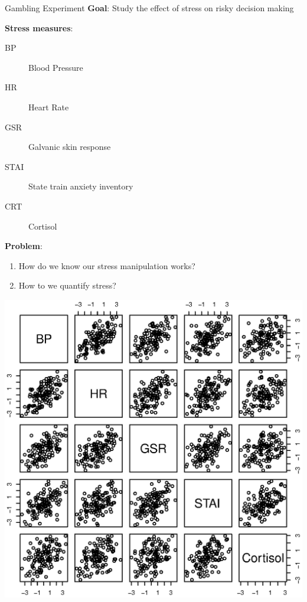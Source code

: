 \begin{frame}{Gambling Experiment}
\textbf{Goal}: Study the effect of stress on risky decision making \par
\textbf{Stress measures}:
	\begin{description}
		\item[BP] Blood Pressure
		\item[HR] Heart Rate
		\item[GSR] Galvanic skin response
		\item[STAI] State train anxiety inventory
		\item[CRT] Cortisol
	\end{description}
\textbf{Problem}:
	\begin{enumerate}
		\item How do we know our stress manipulation works?
		\item How to we quantify stress?
	\end{enumerate}
\end{frame}

\begin{frame}
	\begin{center}
        		\includegraphics[scale=.5, center]{figures/stress_pairs.eps}
    	\end{center}
\end{frame}

